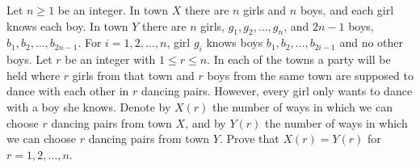 Let $n\ge 1$ be an integer. In town $X$ there are $n$ girls and $n$ boys, and each girl knows each boy. In town $Y$ there are $n$ girls, $g_1,g_2,\ldots ,g_n$,  and $2n-1$ boys, $b_1,b_2,\ldots  ,b_{2n-1}$. For $i=1,2,\ldots ,n$,  girl $g_i$ knows boys $b_1,b_2,\ldots ,b_{2i-1}$ and no other boys. Let $r$ be an integer with $1\le r\le n$. In each of the towns a party will be held where $r$ girls from that town and $r$ boys from the same town are supposed to dance with each other in $r$ dancing pairs. However, every girl only wants to dance with a boy she knows. Denote by $X(r)$ the number of ways in which we can choose $r$ dancing pairs from town $X$,  and by $Y(r)$ the number of ways in which we can choose $r$ dancing pairs from town $Y$. Prove that $X(r)=Y(r)$ for $r=1,2,\ldots ,n$.